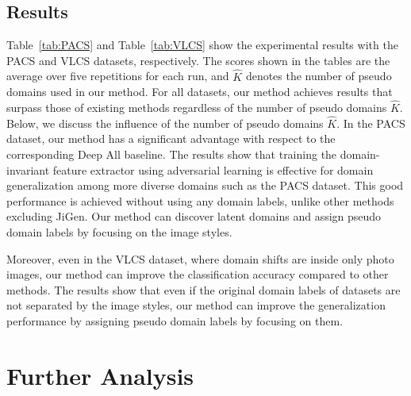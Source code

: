\documentclass[letterpaper]{article} \usepackage{aaai20}  \usepackage{times}  \usepackage{helvet} \usepackage{courier}  \usepackage[hyphens]{url}  \usepackage{graphicx} \urlstyle{rm} \def\UrlFont{\rm}  \usepackage{graphicx}  \usepackage[whole]{bxcjkjatype}
\begin{document}
\subsection{Results}
Table~\ref{tab:PACS} and Table~\ref{tab:VLCS} show the experimental results with the PACS and VLCS datasets, respectively. The scores shown in the tables are the average over five repetitions for each run, and $\hat{K}$ denotes the number of pseudo domains used in our method. For all datasets, our method achieves results that surpass those of existing methods regardless of the number of pseudo domains $\hat{K}$.
Below, we discuss the influence of the number of pseudo domains $\hat{K}$. In the PACS dataset, our method has a significant advantage with respect to the corresponding Deep All baseline. The results show that training the domain-invariant feature extractor using adversarial learning is effective for domain generalization among more diverse domains such as the PACS dataset. This good performance is achieved without using any domain labels, unlike other methods excluding JiGen. Our method can discover latent domains and assign pseudo domain labels by focusing on the image styles.\par
Moreover, even in the VLCS dataset, where domain shifts are inside only photo images, our method can improve the classification accuracy compared to other methods.
The results show that even if the original domain labels of datasets are not separated by the image styles, our method can improve the generalization performance by assigning pseudo domain labels by focusing on them.

\section{Further Analysis}
\begin{table}[t]
    \centering
    \caption{Results of the ablation study in the PACS dataset. For details about the meaning of columns, see Table~\ref{tab:PACS}.}
    \label{tab:ablation}
\end{table}
\end{document}

